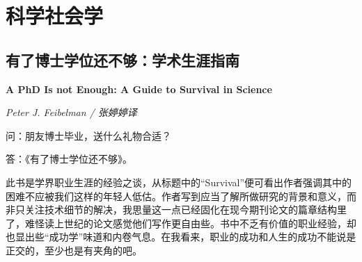 \section{科学社会学}

\subsection*{有了博士学位还不够：学术生涯指南}
\par \textbf{A PhD Is not Enough: A Guide to Survival in Science}
\par \emph{Peter J. Feibelman / 张婷婷译} 
\par 问：朋友博士毕业，送什么礼物合适？
\par 答：《有了博士学位还不够》。
\par 此书是学界职业生涯的经验之谈，从标题中的“Survival”便可看出作者强调其中的困难不应被我们这样的年轻人低估。作者写到应当了解所做研究的背景和意义，而非只关注技术细节的解决，我思量这一点已经固化在现今期刊论文的篇章结构里了，难怪读上世纪的论文感觉他们写作更自由些。书中不乏有价值的职业经验，却也显出些“成功学”味道和内卷气息。在我看来，职业的成功和人生的成功不能说是正交的，至少也是有夹角的吧。
\par {}
